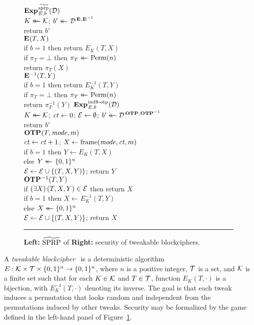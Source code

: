 \newcommand{\otpsec}{\notionfont{IND\$\mbox{-}OTP}}
\newcommand{\OTPO}{\oraclefont{OTP}}
\newcommand{\mode}{\varfont{mode}}
\newcommand{\OTP}{\schemefont{otp}}
\newcommand{\INIT}{\schemefont{init}}
\newcommand{\calM}{\setfont{M}}
\begin{figure}
  \newcommand{\fmtframe}{\schemefont{frame}}
  {
    \underline{$\Exp{\tsprp}_{E,b}(\advD)$}\\[2pt]
      $K \mathrel{\leftarrow\mkern-14mu\leftarrow} \mathcal{K}$;
      $b' \mathrel{\leftarrow\mkern-14mu\leftarrow} \mathcal{D}^{\,\textbf{E}\hspace{0.5pt},\textbf{E}\hspace{0.5pt}^{-1}}$\\
      return $b'$
    \\[6pt]
    \underline{$\textbf{E}\hspace{0.5pt}(T, X)$}\\[2pt]
      if $b=1$ then return $E_K(T, X)$\\
      if $\pi_T = \bot$ then $\pi_T \mathrel{\leftarrow\mkern-14mu\leftarrow} \mathrm{Perm}(n)$\\
      return $\pi_T(X)$
    \\[14pt]
    \underline{$\textbf{E}\hspace{0.5pt}^{-1}(T, Y)$}\\[2pt]
      if $b=1$ then return $E^{-1}_K(T, Y)$\\
      if $\pi_T = \bot$ then $\pi_T \mathrel{\leftarrow\mkern-14mu\leftarrow} \mathrm{Perm}(n)$\\
      return $\pi^{-1}_T(Y)$
  }
  {
    \underline{$\Exp{\otpsec}_{E,b}(\advD)$}\\[2pt]
       $K \mathrel{\leftarrow\mkern-14mu\leftarrow} \mathcal{K}$; $\mathit{ct} \gets 0$; $\mathcal{E} \gets \emptyset$;
       $b' \getsr \advD^{\,\OTPO,\OTPO^{-1}}$\\
       return $b'$
    \\[6pt]
    \underline{$\OTPO(T, \mode, m)$}\\[2pt]
      $\mathit{ct} \gets \mathit{ct} + 1$;
      $X \gets \fmtframe(\mode, \ct, m)$
        \\
      if $b=1$ then $Y \gets E_K(T, X)$\\
      else $Y \mathrel{\leftarrow\mkern-14mu\leftarrow} \{0,1\}^n$\\
      $\mathcal{E} \gets \mathcal{E} \cup \{(T, X, Y)\}$; return $Y$
    \\[6pt]
    \underline{$\OTPO^{-1}(T,Y)$}\\[2pt]
      if $(\exists X)\,(T, X, Y) \in \mathcal{E}$ then return $X$\\
      if $b=1$ then $X \gets E^{-1}_K(T, Y)$\\
      else $X \mathrel{\leftarrow\mkern-14mu\leftarrow} \{0,1\}^n$\\
      $\mathcal{E} \gets \mathcal{E} \cup \{(T, X, Y)\}$; return $X$
  }
  \caption{\textbf{Left:} $\widetilde{\textnormal{SPRP}}$ of \textbf{Right:} \otpsec security of
  tweakable blockciphers.}
  \label{fig2}
  \vspace{6pt}
  \hrule
\end{figure}
A \emph{tweakable blockcipher}~\cite{liskov2011tweakable} is a deterministic algorithm
$E:\mathcal{K}\times\mathcal{T}\times\{0,1\}^n\to\{0,1\}^n$, where $n$ is a positive integer, $\mathcal{T}$ is a set,
and $\mathcal{K}$ is a finite set such that for each $K\in\mathcal{K}$ and $T\in\mathcal{T}$,
function $E_K(T,\cdot)$ is a bijection, with $E_K^{-1}(T,\cdot)$ denoting its
inverse.
%
The goal is that each tweak induces a permutation that looks random and
independent from the permutations induced by other tweaks. Security may be
formalized by the game defined in the left-hand panel of Figure~\ref{fig2}.

